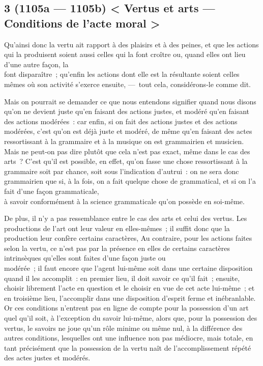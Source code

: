 \documentclass[french,twoside]{book} %
\begin{document}
\subsection[{3 (1105a — 1105b) < Vertus et arts — Conditions de l’acte moral >}]{3 (1105a — 1105b) < Vertus et arts — Conditions de l’acte moral >}
\noindent Qu’ainsi donc la vertu ait rapport à des plaisirs et à des peines, et que les actions qui la produisent soient aussi celles qui la font croître ou, quand elles ont lieu d’une autre façon, la \\
font disparaître ; qu’enfin les actions dont elle est la résultante soient celles mêmes où son activité s’exerce ensuite, — tout cela, considérons-le comme dit.\par
Mais on pourrait se demander ce que nous entendons signifier quand nous disons qu’on ne devient juste qu’en faisant des actions justes, et modéré qu’en faisant des actions modérées : car enfin, si on fait des actions justes et des actions \\
modérées, c’est qu’on est déjà juste et modéré, de même qu’en faisant des actes ressortissant à la grammaire et à la musique on est grammairien et musicien. Mais ne peut-on pas dire plutôt que cela n’est pas exact, même dans le cas des arts ? C’est qu’il est possible, en effet, qu’on fasse une chose ressortissant à la grammaire soit par chance, soit sous l’indication d’autrui : on ne sera donc grammairien que si, à la fois, on a fait quelque chose de grammatical, et si on l’a fait d’une façon grammaticale, \\
à savoir conformément à la science grammaticale qu’on possède en soi-même.\par
De plus, il n’y a pas ressemblance entre le cas des arts et celui des vertus. Les productions de l’art ont leur valeur en elles-mêmes ; il suffit donc que la production leur confère certains caractères, Au contraire, pour les actions faites selon la vertu, ce n’est pas par la présence en elles de certains caractères intrinsèques qu’elles sont faites d’une façon juste ou \\
modérée ; il faut encore que l’agent lui-même soit dans une certaine disposition quand il les accomplit : en premier lieu, il doit savoir ce qu’il fait ; ensuite, choisir librement l’acte en question et le choisir en vue de cet acte lui-même ; et en troisième lieu, l’accomplir dans une disposition d’esprit ferme  et inébranlable. Or ces conditions n’entrent pas en ligne de compte pour la possession d’un art quel qu’il soit, à l’exception du savoir lui-même, alors que, pour la possession des vertus, le savoirs ne joue qu’un rôle minime ou même nul, à la différence des autres conditions, lesquelles ont une influence non pas médiocre, mais totale, en tant précisément que la possession de la vertu naît de l’accomplissement répété des actes justes et modérés.\par
\end{document}
